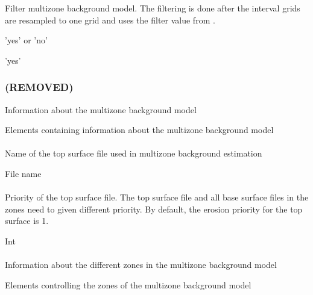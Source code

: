 \subsubsection{}
 \slist
   \item \Description Filter multizone background model. The filtering is done after the interval grids are resampled to one grid and uses the filter value from .
   \item \Argument 'yes' or 'no'
   \item \Default 'yes'
 \elist

\subsubsection{ (REMOVED)}
 \slist
   \item \Description  Information about the multizone background model
   \item \Argument Elements containing information about the multizone background model
   \item \Default
 \elist

\paragraph{}
 \slist
   \item \Description Name of the top surface file used in multizone background estimation
   \item \Argument File name
   \item \Default
 \elist

\paragraph{}
 \slist
   \item \Description Priority of the top surface file. The top surface file and all base surface files in the zones need to given different priority. By default, the erosion priority for the top surface is 1.
   \item \Argument Int
   \item {}
 \elist

\paragraph{}
 \slist
   \item \Description Information about the different zones in the multizone background model
   \item \Argument Elements controlling the zones of the multizone background model
   \item \Default
 \elist

